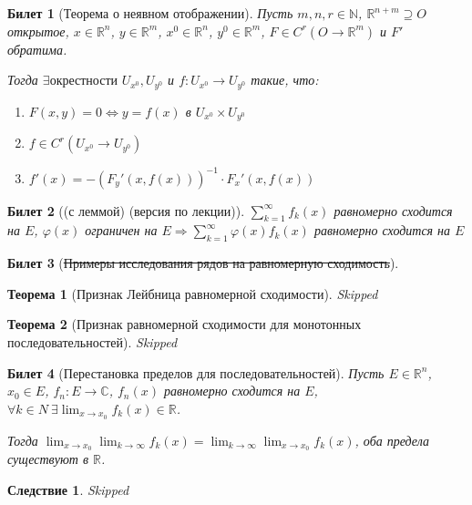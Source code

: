 \documentclass[11pt,a4paper,oneside]{scrartcl}
\newtheorem*{theorem}{Теорема}
\newtheorem{consequence}{Следствие}
\newtheorem{ticket}{Билет}
\begin{document}
\begin{ticket}[Теорема о неявном отображении]
    Пусть $m, n, r \in \mathbb{N}$, $\mathbb{R}^{n+m} \supseteq O$ открытое,
    $x \in \mathbb{R}^n$, $y \in \mathbb{R}^m$, $x^0 \in \mathbb{R}^n$, $y^0 \in \mathbb{R}^m$,
    $F \in C^r(O \rightarrow \mathbb{R}^m)$
    и $F'$ обратима.

    Тогда $\exists \text{окрестности } U_{x^0}, U_{y^0}$ и $f: U_{x^0} \rightarrow U_{y^0}$
    такие, что:
    \begin{enumerate}
        \item $F(x, y) = 0 \Leftrightarrow y = f(x)$ в $U_{x^0} \times U_{y^0}$
        \item $f \in C^r(U_{x^0} \rightarrow U_{y^0})$
        \item $f'(x) = -(F_y'(x, f(x)))^{-1} \cdot F_x'(x, f(x))$
    \end{enumerate}
\end{ticket}

\setcounter{ticket}{27}
\addtocounter{ticket}{-1}
\begin{ticket}[(с леммой) (версия по лекции)]
    $\sum_{k=1}^\infty f_k(x)$ равномерно сходится на $E$, $\varphi(x)$ ограничен
    на $E \Rightarrow \sum_{k=1}^\infty \varphi(x) f_k(x)$
    равномерно сходится на $E$
\end{ticket}

\begin{ticket}[\sout{Примеры исследования рядов на равномерную сходимость}]
\end{ticket}

\begin{theorem}[Признак Лейбница равномерной сходимости]
    Skipped
\end{theorem}

\begin{theorem}[Признак равномерной сходимости для монотонных последовательностей]
    Skipped
\end{theorem}

\begin{ticket}[Перестановка пределов для последовательностей]
    Пусть $E \in \mathbb{R}^n$, $x_0 \in E$, $f_n : E \rightarrow \mathbb{C}$,
    ${f_n (x)}$ равномерно сходится на $E$, $\forall k \in N \
    \exists \lim_{x \rightarrow x_0} f_k(x) \in \mathbb{R}$.

    Тогда $\lim_{x \rightarrow x_0} \lim_{k \rightarrow \infty} f_k(x) =
    \lim_{k \rightarrow \infty} \lim_{x \rightarrow x_0} f_k(x)$,
    оба предела существуют в $\mathbb{R}$.
\end{ticket}

\setcounter{consequence}{0}
\begin{consequence}
    Skipped
\end{consequence}
\end{document}
